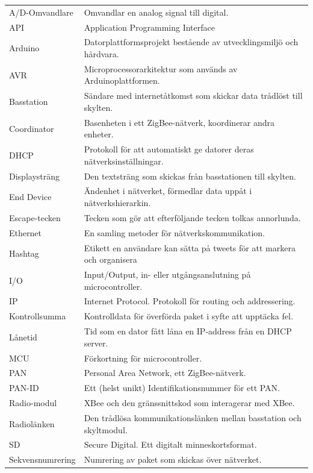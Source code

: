 \documentclass[a4paper,11pt]{article}
\begin{document}
\begin{table}[h!]
	\begin{tabular}{|l|l|}
A/D-Omvandlare & Omvandlar en analog signal till digital.\\
API & Application Programming Interface\\
Arduino & Datorplattformsprojekt bestående av utvecklingsmiljö och hårdvara.\\	
AVR & Microprocessorarkitektur som används av Arduinoplattformen.\\
Basstation & Sändare med internetåtkomst som skickar data trådlöst till skylten.\\
Coordinator & Basenheten i ett ZigBee-nätverk, koordinerar andra enheter.\\
DHCP & Protokoll för att automatiskt ge datorer deras nätverksinställningar.\\
Displaysträng & Den textsträng som skickas från basstationen till skylten.\\
End Device & Ändenhet i nätverket, förmedlar data uppåt i nätverkshierarkin.\\
Escape-tecken & Tecken som gör att efterföljande tecken tolkas annorlunda.\\
Ethernet & En samling metoder för nätverkskommunikation.\\
Hashtag & Etikett en användare kan sätta på tweets för att markera och organisera\\
I/O & Input/Output, in- eller utgångsanslutning på microcontroller.\\
IP & Internet Protocol. Protokoll för routing och addressering.\\
Kontrollsumma & Kontrolldata för överförda paket i syfte att upptäcka fel.\\
Lånetid & Tid som en dator fått låna en IP-address från en DHCP server.\\
MCU & Förkortning för microcontroller. \\
PAN & Personal Area Network, ett ZigBee-nätverk.\\
PAN-ID & Ett (helst unikt) Identifikationsnummer för ett PAN.\\
Radio-modul & XBee och den gränssnittskod som interagerar med XBee.\\
Radiolänken & Den trådlösa kommunikationslänken mellan basstation och skyltmodul.\\
SD & Secure Digital. Ett digitalt minneskortsformat.\\
Sekvensnumrering & Numrering av paket som skickas över nätverket.\\

\end{tabular}
\end{table}
\end{document}
